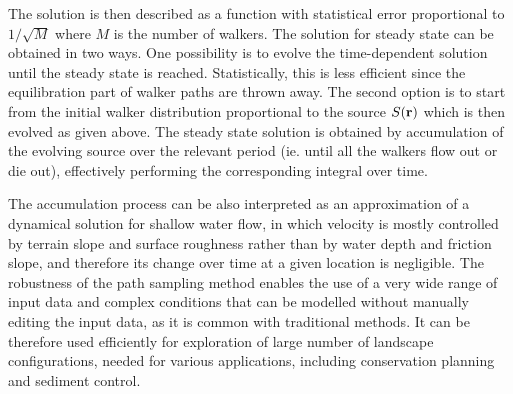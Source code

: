 \documentclass[fleqn,12pt,twoside]{article}
\begin{document}
The solution is then described as a function with statistical error 
proportional to $1/\sqrt{M}$ where $M$ is the number of walkers. 
The solution for steady state can be obtained in two ways. One possibility
is to evolve the time-dependent solution until the steady state is reached.
Statistically, this is less efficient since the equilibration 
part of walker paths are thrown away. The second option is to start
from the initial walker distribution proportional to the source 
$S({\bf r)}$ which is then evolved as given above. The steady
state solution is obtained by accumulation of the evolving source over
the relevant period (ie. until all the walkers flow out or die out),
 effectively performing the corresponding integral over time.

The accumulation process can be also interpreted as an approximation of
a
dynamical solution for shallow water flow, in which
velocity is mostly controlled by terrain slope and surface
roughness rather than by water depth and friction slope, and therefore its
change over time at a given location is negligible.
The robustness of the path sampling method enables the use of a very wide 
range of input data and complex conditions that can be modelled without 
manually editing the input data, as it is common with traditional methods. 
It can be therefore used efficiently for exploration of large number of 
landscape configurations, needed for various applications, including conservation
planning and sediment control.
\end{document}
